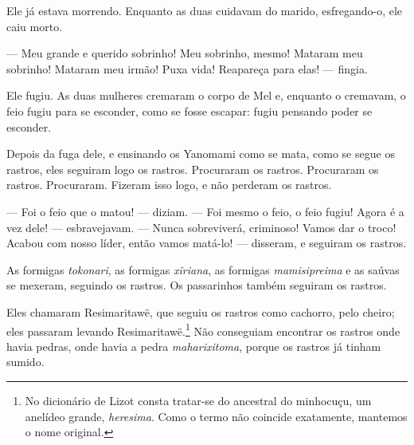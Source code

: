 Ele já estava morrendo. Enquanto as duas cuidavam do marido,
esfregando-o, ele caiu morto. 


--- Meu grande e querido sobrinho! Meu sobrinho, mesmo! Mataram meu
sobrinho! Mataram meu irmão! Puxa vida! Reapareça para elas! ---
fingia. 


Ele fugiu. As duas mulheres cremaram o corpo de Mel e, enquanto o
cremavam, o feio fugiu para se esconder, como se fosse escapar: fugiu
pensando poder se esconder. 

Depois da fuga dele, e ensinando os Yanomami como se mata, como se segue os
rastros, eles seguiram logo os rastros. Procuraram os rastros.
Procuraram os rastros. Procuraram. Fizeram isso logo, e não perderam os
rastros. 

--- Foi o feio que o matou! --- diziam. --- Foi mesmo o feio, o feio
fugiu! Agora é a vez dele! --- esbravejavam. --- Nunca sobreviverá,
criminoso! Vamos dar o troco! Acabou com nosso líder, então vamos
matá-lo! --- disseram, e seguiram os rastros. 

As formigas \textit{tokonari}, as formigas \textit{xĩriana}, as
formigas \textit{mamisipreima} e as saúvas se mexeram, seguindo os
rastros. Os passarinhos também seguiram os rastros. 

Eles chamaram {Resimaritawë}, que seguiu os rastros como cachorro,
pelo cheiro; eles passaram levando Resimaritawë.\footnote{No dicionário de Lizot consta tratar-se do ancestral do minhocuçu, um anelídeo grande, \textit{heresima}. Como o termo não coincide exatamente, mantemos o nome original.} Não conseguiam encontrar os rastros onde havia pedras, onde havia a
pedra \textit{maharixitoma}, porque os rastros já tinham sumido. 


